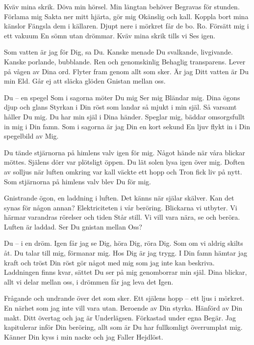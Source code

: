 \startpoem
Kväv mina skrik.
Döva min hörsel.
Min längtan behöver 
Begravas för stunden.
Förlama mig
Sakta ner mitt hjärta, gör mig
Okänslig och kall.
Koppla bort mina känslor
Fängsla dem i källaren.
Djupt nere i mörkret får de bo.
Ro.
Försätt mig i ett vakuum
En sömn utan drömmar.
Kväv mina skrik tills vi
Ses igen.
\stoppoem

\startpoem
Som vatten är jag för Dig, sa Du.
Kanske menade Du svalkande,
livgivande.
Kanske porlande, bubblande.
Ren och genomskinlig
Behaglig transparens.
Lever på vågen av Dina ord.
Flyter fram genom allt som sker.
Är jag Ditt vatten är Du min 
Eld.
Går ej att släcka glöden
Gnistan
mellan oss.
\stoppoem

\startpoem
Du – en spegel 
Som i sagorna möter Du mig
Ser mig
Bländar mig.
Dina ögons djup och glans
Styrkan i Din röst som landar så mjukt 
i min själ.
Så varsamt håller Du mig.
Du har min själ i Dina händer.
Speglar mig, bäddar omsorgsfullt in mig i
Din famn.
Som i sagorna är jag Din en kort sekund
En ljuv flykt in i Din spegelbild av
Mig.
\stoppoem

\startpoem
Du tände stjärnorna på himlens valv igen
för mig.
Något hände när våra blickar möttes.
Själens dörr var plötsligt öppen.
Du lät solen lysa igen 
över mig.
Doften av solljus när 
luften omkring var kall
väckte ett hopp och
Tron fick liv på nytt.
Som stjärnorna på himlens valv blev Du 
för mig.
\stoppoem

\startpoem
Gnistrande ögon, 
en laddning i luften.
Det känns när själar skälver.
Kan det synas för någon annan?
Elektriciteten i vår beröring.
Blickarna vi utbyter.
Vi härmar varandras rörelser och tiden
Står still. 
Vi vill vara nära,
se och beröra.
Luften är laddad.
Ser Du gnistan mellan 
Oss?
\stoppoem

\startpoem
Du – i en dröm.
Igen får jag se Dig, höra Dig, röra Dig.
Som om vi aldrig skilts åt.
Du talar till mig, förmanar mig.
Hos Dig är jag trygg.
I Din famn hämtar jag kraft och tröst
Din röst gör något med mig
som jag inte kan beskriva.
Laddningen finns kvar,
sättet Du ser på mig genomborrar min själ.
Dina blickar, allt vi delar mellan oss,
i drömmen får jag leva det
Igen.
\stoppoem

\startpoem
Frågande och undrande
över det som sker.
Ett själens hopp – 
ett ljus i mörkret.
En närhet som jag inte vill vara utan.
Beroende av Din styrka.
Hänförd av Din makt.
Ditt övertag och jag är 
Underlägsen.
Förkastad under egna 
Begär.
Jag kapitulerar inför 
Din beröring, allt som är Du
har fullkomligt överrumplat mig.
Känner Din kyss i min nacke och jag
Faller
Hejdlöst.
\stoppoem

